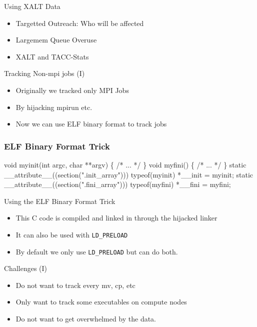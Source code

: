 \documentclass{beamer}
\begin{document}
\begin{frame}{Using XALT Data}
  \begin{itemize}
    \item Targetted Outreach: Who will be affected
    \item Largemem Queue Overuse
    \item XALT and TACC-Stats
  \end{itemize}
\end{frame}

\begin{frame}{Tracking Non-mpi jobs (I)}
  \begin{itemize}
    \item Originally we tracked only MPI Jobs
    \item By hijacking mpirun etc.
    \item Now we can use ELF binary format to track jobs
  \end{itemize}
\end{frame}

\begin{frame}[fragile]
    \frametitle{ELF Binary Format Trick}
 {\small
    \begin{semiverbatim}
void myinit(int argc, char **argv)
\{
  /* ... */
\}
void myfini()
\{
  /* ... */
\}
  static __attribute__((section(".init_array")))
       typeof(myinit) *__init = myinit;
  static __attribute__((section(".fini_array")))
       typeof(myfini) *__fini = myfini;
    \end{semiverbatim}
}
\end{frame}

\begin{frame}{Using the ELF Binary Format Trick}
  \begin{itemize}
    \item This C code is compiled and linked in through the hijacked linker
    \item It can also be used with \texttt{LD\_PRELOAD}
    \item By default we only use \texttt{LD\_PRELOAD} but can do both.
  \end{itemize}
\end{frame}

\begin{frame}{Challenges (I)}
  \begin{itemize}
    \item Do not want to track every mv, cp, etc
    \item Only want to track some executables on compute nodes
    \item Do not want to get overwhelmed by the data. 
  \end{itemize}
\end{frame}
\end{document}
